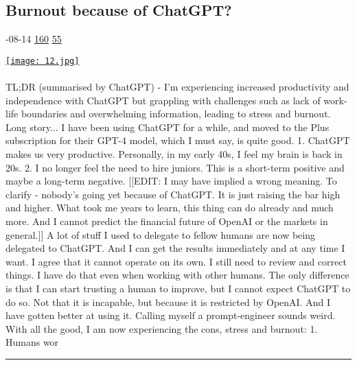 \documentclass[10pt,a4paper]{article}
\begin{document}
\begin{multicols}{2}
\begin{minipage}{\linewidth}
\subsection{Burnout because of ChatGPT?}
\textsc{\footnotesize
{\scriptsize\faCalendar}-08-14 
{\scriptsize\faThumbsOUp}\space 
\href{http://news.ycombinator.com/item?id=37138807\&utm\_term=comment}{160} 
{\scriptsize\faComments}\space 
\href{http://news.ycombinator.com/item?id=37138807\&utm\_term=comment}{55} 
}
\par\medskip\noindent
\href{https://news.ycombinator.com/item?id=37126182\&utm\_source=hackernewsletter\&utm\_medium=email\&utm\_term=ask\_hn}{
    \texttt{[image: 12.jpg]}
}
\end{minipage}
\paragraph{}
TL;DR (summarised by ChatGPT) - I'm experiencing increased productivity and independence with ChatGPT but grappling with challenges such as lack of work-life boundaries and overwhelming information, leading to stress and burnout.
Long story...
I have been using ChatGPT for a while, and moved to the Plus subscription for their GPT-4 model, which I must say, is quite good.
1. ChatGPT makes us very productive. Personally, in my early 40s, I feel my brain is back in 20s.
2. I no longer feel the need to hire juniors. This is a short-term positive and maybe a long-term negative.
[[EDIT: I may have implied a wrong meaning. To clarify - nobody's going yet because of ChatGPT. It is just raising the bar high and higher. What took me years to learn, this thing can do already and much more. And I cannot predict the financial future of OpenAI or the markets in general.]]
A lot of stuff I used to delegate to fellow humans are now being delegated to ChatGPT. And I can get the results immediately and at any time I want. I agree that it cannot operate on its own. I still need to review and correct things. I have do that even when working with other humans. The only difference is that I can start trusting a human to improve, but I cannot expect ChatGPT to do so. Not that it is incapable, but because it is restricted by OpenAI.
And I have gotten better at using it. Calling myself a prompt-engineer sounds weird.
With all the good, I am now experiencing the cons, stress and burnout:
1. Humans wor
\par\noindent\textcolor{red}{\rule{\linewidth}{0.2mm}}
\vfill
\null
\noindent\begin{minipage}{\linewidth}

\end{minipage}
\end{multicols}
\end{document}
